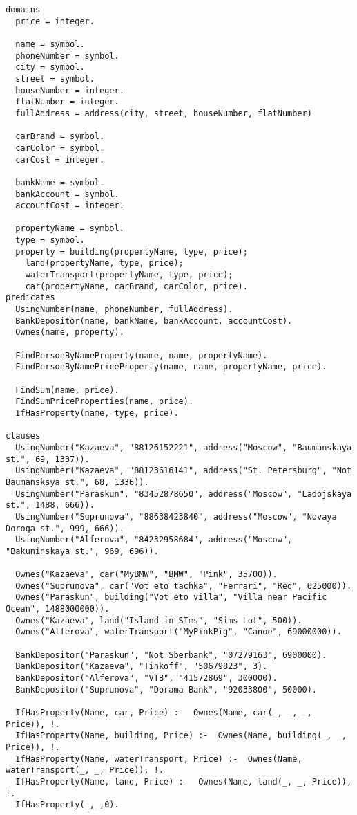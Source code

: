 \begin{lstlisting}
domains
  price = integer.

  name = symbol.
  phoneNumber = symbol.
  city = symbol.
  street = symbol.
  houseNumber = integer.
  flatNumber = integer.
  fullAddress = address(city, street, houseNumber, flatNumber)

  carBrand = symbol.
  carColor = symbol.
  carCost = integer.

  bankName = symbol.
  bankAccount = symbol.
  accountCost = integer.

  propertyName = symbol.
  type = symbol.
  property = building(propertyName, type, price);
    land(propertyName, type, price);
    waterTransport(propertyName, type, price);
    car(propertyName, carBrand, carColor, price).
predicates
  UsingNumber(name, phoneNumber, fullAddress).
  BankDepositor(name, bankName, bankAccount, accountCost).
  Ownes(name, property).

  FindPersonByNameProperty(name, name, propertyName).
  FindPersonByNamePriceProperty(name, name, propertyName, price).

  FindSum(name, price).
  FindSumPriceProperties(name, price).
  IfHasProperty(name, type, price).

clauses
  UsingNumber("Kazaeva", "88126152221", address("Moscow", "Baumanskaya st.", 69, 1337)).
  UsingNumber("Kazaeva", "88123616141", address("St. Petersburg", "Not Baumansksya st.", 68, 1336)).
  UsingNumber("Paraskun", "83452878650", address("Moscow", "Ladojskaya st.", 1488, 666)).
  UsingNumber("Suprunova", "88638423840", address("Moscow", "Novaya Doroga st.", 999, 666)).
  UsingNumber("Alferova", "84232958684", address("Moscow", "Bakuninskaya st.", 969, 696)).

  Ownes("Kazaeva", car("MyBMW", "BMW", "Pink", 35700)).
  Ownes("Suprunova", car("Vot eto tachka", "Ferrari", "Red", 625000)).
  Ownes("Paraskun", building("Vot eto villa", "Villa near Pacific Ocean", 1488000000)).
  Ownes("Kazaeva", land("Island in SIms", "Sims Lot", 500)).
  Ownes("Alferova", waterTransport("MyPinkPig", "Canoe", 69000000)).

  BankDepositor("Paraskun", "Not Sberbank", "07279163", 6900000).
  BankDepositor("Kazaeva", "Tinkoff", "50679823", 3).
  BankDepositor("Alferova", "VTB", "41572869", 300000).
  BankDepositor("Suprunova", "Dorama Bank", "92033800", 50000).

  IfHasProperty(Name, car, Price) :-  Ownes(Name, car(_, _, _, Price)), !.
  IfHasProperty(Name, building, Price) :-  Ownes(Name, building(_, _, Price)), !.
  IfHasProperty(Name, waterTransport, Price) :-  Ownes(Name, waterTransport(_, _, Price)), !.
  IfHasProperty(Name, land, Price) :-  Ownes(Name, land(_, _, Price)), !.
  IfHasProperty(_,_,0).


\end{lstlisting}
